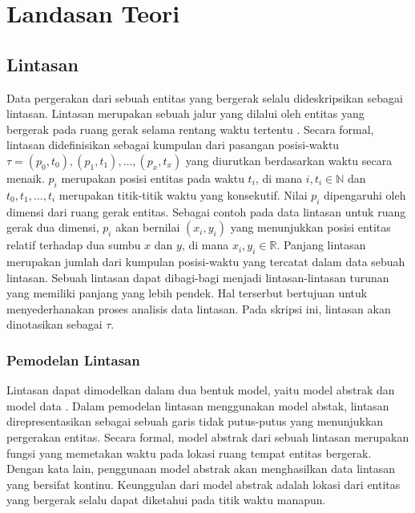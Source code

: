 \chapter{Landasan Teori}
\label{chap:teori}

\section{Lintasan}
\label{sec:lintasan}

Data pergerakan dari sebuah entitas yang bergerak selalu dideskripsikan sebagai lintasan. Lintasan merupakan sebuah jalur yang dilalui oleh entitas yang bergerak pada ruang gerak selama rentang waktu tertentu \cite{wiratma:trajectory}. Secara formal, lintasan didefinisikan sebagai kumpulan dari pasangan posisi-waktu $\tau = (p_0, t_0), (p_1, t_1), \ldots, (p_x, t_x)$ yang diurutkan berdasarkan waktu secara menaik. $p_i$ merupakan posisi entitas pada waktu $t_i$, di mana $i, t_i \in \mathbb{N}$ dan $t_0, t_1, \ldots, t_i$ merupakan titik-titik waktu yang konsekutif. Nilai $p_i$ dipengaruhi oleh dimensi dari ruang gerak entitas. Sebagai contoh pada data lintasan untuk ruang gerak dua dimensi, $p_i$ akan bernilai $(x_i, y_i)$ yang menunjukkan posisi entitas relatif terhadap dua sumbu $x$ dan $y$, di mana $x_i, y_i \in \mathbb{R}$. Panjang lintasan merupakan jumlah dari kumpulan posisi-waktu yang tercatat dalam data sebuah lintasan. Sebuah lintasan dapat dibagi-bagi menjadi lintasan-lintasan turunan yang memiliki panjang yang lebih pendek. Hal terserbut bertujuan untuk menyederhanakan proses analisis data lintasan. Pada skripsi ini, lintasan akan dinotasikan sebagai $\tau$.

\subsection{Pemodelan Lintasan}
\label{subsec:pemodelan}

Lintasan dapat dimodelkan dalam dua bentuk model, yaitu model abstrak dan model data \cite{wiratma:trajectory}. Dalam pemodelan lintasan menggunakan model abstak, lintasan direpresentasikan sebagai sebuah garis tidak putus-putus yang menunjukkan pergerakan entitas. Secara formal, model abstrak dari sebuah lintasan merupakan fungsi yang memetakan waktu pada lokasi ruang tempat entitas bergerak. Dengan kata lain, penggunaan model abstrak akan menghasilkan data lintasan yang bersifat kontinu. Keunggulan dari model abstrak adalah lokasi dari entitas yang bergerak selalu dapat diketahui pada titik waktu manapun. 

